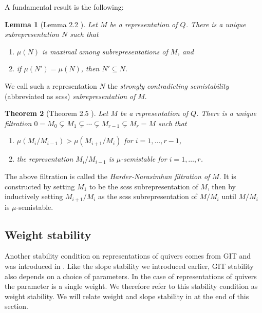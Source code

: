 \documentclass[a4paper]{amsart}
\numberwithin{equation}{section}
\theoremstyle{plain}
\newtheorem{theorem}{Theorem}[section]
\newtheorem{lemma}[theorem]{Lemma}
\theoremstyle{definition}
\begin{document}
A fundamental result is the following: 
\begin{lemma}[Lemma 2.2 \cite{MR1906875}]\label{scss_lem}
Let $M$ be a representation of $Q$. There is a unique subrepresentation $N$ such that 
\begin{enumerate}
    \item $\mu(N)$ is maximal among subrepresentations of $M$, and 
    \item if $\mu(N')=\mu(N)$, then $N'\subseteq N$.
\end{enumerate}
\end{lemma}

We call such a representation $N$ the \emph{strongly contradicting semistability }(abbreviated as scss) \emph{subrepresentation of }$M$.

\begin{theorem}[Theorem 2.5 \cite{MR1906875}]\label{HN}
Let $M$ be a representation of $Q$. There is a unique filtration $0=M_0\subsetneq M_1\subsetneq \cdots\subsetneq M_{r-1}\subsetneq M_r = M$ such that 
\begin{enumerate}
\item $\mu(M_i/M_{i-1})>\mu(M_{i+1}/M_{i})$ for $i=1,\ldots, r-1$,
\item the representation $M_i/M_{i-1}$ is $\mu$-semistable for $i=1,\ldots,r$.
\end{enumerate}
\end{theorem}

The above filtration is called the \emph{Harder-Narasimhan filtration of} $M$. It is constructed by setting $M_1$ to be the scss subrepresentation of $M$, then by inductively setting $M_{i+1}/M_{i}$ as the scss subrepresentation of $M/M_{i}$ until $M/M_i$ is $\mu$-semistable.

\subsection{Weight stability}
Another stability condition on representations of quivers comes from GIT and was introduced in \cite{MR1315461}. Like the slope stability we introduced earlier, GIT stability also depends on a choice of parameters. In the case of representations of quivers the parameter is a single weight.  We therefore refer to this stability condition as weight stability. We will relate weight and slope stability in  at the end of this section. 
\end{document}
